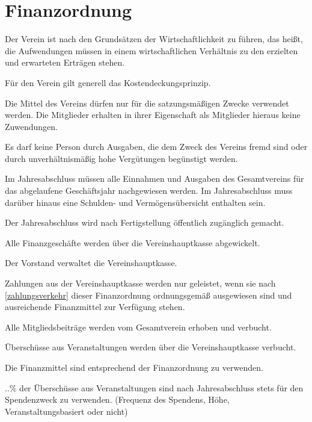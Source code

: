 \section{Finanzordnung}

\begin{finanz}


  Der Verein ist nach den Grundsätzen der Wirtschaftlichkeit zu führen, das heißt, die Aufwendungen müssen in einem wirtschaftlichen Verhältnis zu den erzielten und erwarteten Erträgen stehen.

  Für den Verein gilt generell das Kostendeckungsprinzip.

  Die Mittel des Vereins dürfen nur für die satzungsmäßigen Zwecke verwendet werden. Die Mitglieder erhalten in ihrer Eigenschaft als Mitglieder hieraus keine Zuwendungen.

  Es darf keine Person durch Ausgaben, die dem Zweck des Vereins fremd sind oder durch unverhältnismäßig hohe Vergütungen begünstigt werden.


  Im Jahresabschluss müssen alle Einnahmen und Ausgaben des Gesamtvereins für das abgelaufene Geschäftsjahr nachgewiesen werden. Im Jahresabschluss muss darüber hinaus eine Schulden- und Vermögensübersicht enthalten sein.

  Der Jahresabschluss wird nach Fertigstellung öffentlich zugänglich gemacht.


  Alle Finanzgeschäfte werden über die Vereinshauptkasse abgewickelt.

  Der Vorstand verwaltet die Vereinshauptkasse.

  Zahlungen aus der Vereinshauptkasse werden nur geleistet, wenn sie nach \ref{zahlungsverkehr} dieser Finanzordnung ordnungsgemäß ausgewiesen sind und ausreichende Finanzmittel zur Verfügung stehen.


  Alle Mitgliedsbeiträge werden vom Gesamtverein erhoben und verbucht.

  Überschüsse aus Veranstaltungen werden über die Vereinshauptkasse verbucht.

  Die Finanzmittel sind entsprechend der Finanzordnung zu verwenden.

  ..\% der Überschüsse aus Veranstaltungen sind nach Jahresabschluss stets für den Spendenzweck zu verwenden. (Frequenz des Spendens, Höhe, Veranstaltungsbasiert oder nicht)


\end{finanz}
